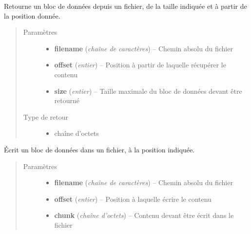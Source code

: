 \documentclass[letterpaper,10pt,english]{sphinxmanual}
\begin{document}
\begin{fulllineitems}
\label{drivers:get_chunk}
Retourne un bloc de données depuis un fichier, de la taille indiquée et à partir de la position donnée.
\begin{quote}\begin{description}
\item[{Paramètres}] \leavevmode\begin{itemize}
\item {} 
\textbf{filename} (\emph{chaîne de caractères}) -- Chemin absolu du fichier

\item {} 
\textbf{offset} (\emph{entier}) -- Position à partir de laquelle récupérer le contenu

\item {} 
\textbf{size} (\emph{entier}) -- Taille maximale du bloc de données devant être retourné

\end{itemize}

\item[{Type de retour}] \leavevmode\begin{itemize}
\item {} 
chaîne d'octets

\end{itemize}

\end{description}\end{quote}

\end{fulllineitems}


\begin{fulllineitems}
\label{drivers:upload_chunk}
Écrit un bloc de données dans un fichier, à la position indiquée.
\begin{quote}\begin{description}
\item[{Paramètres}] \leavevmode\begin{itemize}
\item {} 
\textbf{filename} (\emph{chaîne de caractères}) -- Chemin absolu du fichier

\item {} 
\textbf{offset} (\emph{entier}) -- Position à laquelle écrire le contenu

\item {} 
\textbf{chunk} (\emph{chaîne d'octets}) -- Contenu devant être écrit dans le fichier

\end{itemize}

\end{description}\end{quote}

\end{fulllineitems}
\end{document}
